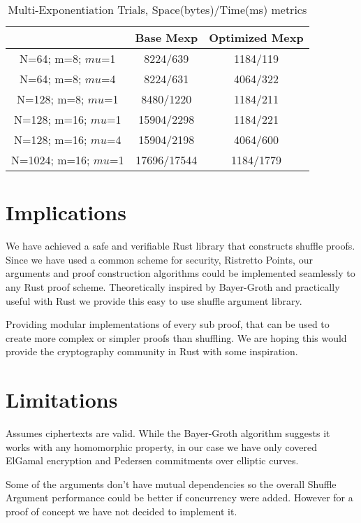 \documentclass[12pt,a4paper]{report}
\begin{document}
\begin{table}
	\begin{center}
	\begin{tabular}{||c|c|c||}\hline
		\backslashbox{Parameters}{Proof Type} & Base Mexp& Optimized Mexp\\
		\hline
		N=64; m=8; $mu$=1 & 8224/639 & 1184/119\\
		\hline
		N=64; m=8; $mu$=4 & 8224/631 & 4064/322 \\
		\hline
		N=128; m=8; $mu$=1 & 8480/1220 & 1184/211\\
		\hline
		N=128; m=16; $mu$=1 & 15904/2298 & 1184/221\\
		\hline
		N=128; m=16; $mu$=4 & 15904/2198 & 4064/600\\
		\hline
		N=1024; m=16; $mu$=1 & 17696/17544 & 1184/1779\\
		\hline
	\end{tabular}
	\end{center}
	\caption{Multi-Exponentiation Trials, Space(bytes)/Time(ms) metrics}
	\label{table:mexp}
\end{table}

\section{Implications}
We have achieved a safe and verifiable Rust library that constructs shuffle proofs.
Since we have used a common scheme for security, Ristretto Points, our arguments and proof construction algorithms could be implemented seamlessly to any Rust proof scheme.
Theoretically inspired by Bayer-Groth and practically useful with Rust we provide this easy to use shuffle argument library.\par
Providing modular implementations of every sub proof, that can be used to create more complex or simpler proofs than shuffling.
We are hoping this would provide the cryptography community in Rust with some inspiration.
\section{Limitations}
Assumes ciphertexts are valid.
While the Bayer-Groth algorithm suggests it works with any homomorphic property,
in our case we have only covered ElGamal encryption and Pedersen commitments over elliptic curves.\par
Some of the arguments don't have mutual dependencies so the overall Shuffle Argument performance
could be better if concurrency were added. However for a proof of concept we have not decided to implement it.
\end{document}

